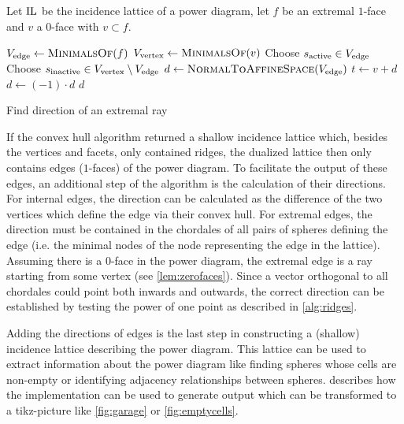 \begin{algorithm}[tbp]
    Let $\operatorname{IL}$ be the incidence lattice of a power diagram, let $f$ be an extremal $1$-face and $v$ a $0$-face with $v \subset f$.
    \begin{algorithmic}[1]
        \State $V_{\textnormal{edge}} \gets \Call{MinimalsOf}{f}$
            \State $V_{\textnormal{vertex}} \gets \Call{MinimalsOf}{v}$
            \State Choose $s_{\textnormal{active}} \in V_{\textnormal{edge}}$
            \State Choose $s_{\textnormal{inactive}} \in V_{\textnormal{vertex}} \setminus V_{\textnormal{edge}}$
            \Statex
            \State $d \gets \Call{NormalToAffineSpace}{V_{\textnormal{edge}}}$
            \State $t \gets v + d$
                \State $d \gets (-1) \cdot d$
            \EndIf
            \State \Return $d$
        \EndFunction
    \end{algorithmic}
    \caption{Find direction of an extremal ray}
    \label{alg:ridges}
\end{algorithm}
If the convex hull algorithm returned a shallow incidence lattice which, besides the vertices and facets, only contained ridges, the dualized lattice then only contains edges ($1$-faces) of the power diagram.
To facilitate the output of these edges, an additional step of the algorithm is the calculation of their directions.
For internal edges, the direction can be calculated as the difference of the two vertices which define the edge via their convex hull.
For extremal edges, the direction must be contained in the chordales of all pairs of spheres defining the edge (i.e. the minimal nodes of the node representing the edge in the lattice).
Assuming there is a $0$-face in the power diagram, the extremal edge is a ray starting from some vertex (see \cref{lem:zerofaces}).
Since a vector orthogonal to all chordales could point both inwards and outwards, the correct direction can be established by testing the power of one point as described in \cref{alg:ridges}.

Adding the directions of edges is the last step in constructing a (shallow) incidence lattice describing the power diagram.
This lattice can be used to extract information about the power diagram like finding spheres whose cells are non-empty or identifying adjacency relationships between spheres.
 describes how the implementation can be used to generate output which can be transformed to a tikz-picture like \cref{fig:garage} or \cref{fig:emptycells}.

